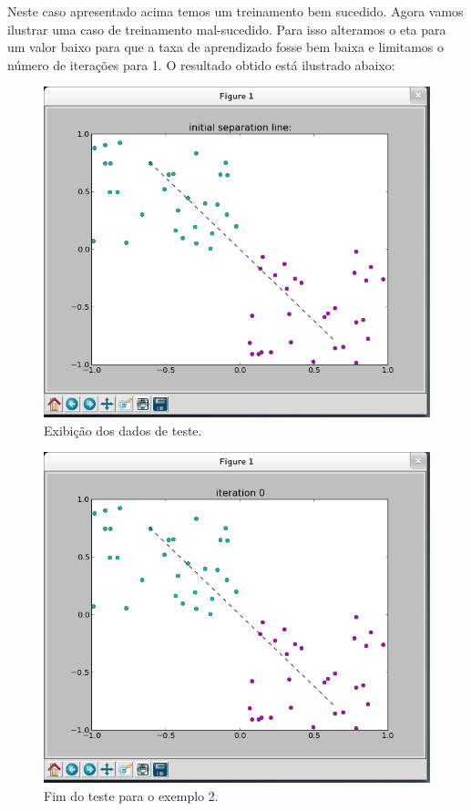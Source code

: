\documentclass[brazil, a4paper]{article}
\begin{document}
\begin{description}
Neste caso apresentado acima temos um treinamento bem sucedido. Agora vamos
ilustrar uma caso de treinamento mal-sucedido. Para isso alteramos o eta para um
valor baixo para que a taxa de aprendizado fosse bem baixa e limitamos o número
de iterações para 1. O resultado obtido está ilustrado abaixo:


\begin{figure}[!htb]
\centering
\includegraphics[scale=0.42]{ex3-1.png}
\caption{Exibição dos dados de teste.}
\end{figure}

\begin{figure}[!htb]
\centering
\includegraphics[scale=0.42]{ex3-2.png}
\caption{Fim do teste para o exemplo 2.}
\end{figure}


\end{description}
\end{document}
